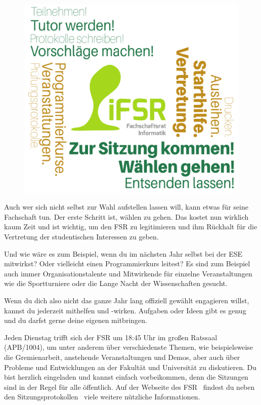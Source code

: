 \begin{figure}[b!]
    \centering
    \includegraphics[width=\linewidth]{img/f1_neu}
\end{figure}

Auch wer sich nicht selbst zur Wahl aufstellen lassen will, kann etwas für seine Fachschaft tun.
Der erste Schritt ist, wählen zu gehen. Das kostet nun wirklich kaum Zeit und ist wichtig, um den FSR zu legitimieren und ihm Rückhalt für die Vertretung der studentischen Interessen zu geben.

Und wie wäre es zum Beispiel, wenn du im nächsten Jahr selbst bei der ESE mitwirkst? Oder vielleicht einen Programmierkurs leitest?
Es sind zum Beispiel auch immer Organisationstalente und Mitwirkende für einzelne Veranstaltungen wie die Sportturniere oder die Lange Nacht der Wissenschaften gesucht.

Wenn du dich also nicht das ganze Jahr lang offiziell gewählt engagieren willst, kannst du jederzeit mithelfen und -wirken. Aufgaben oder Ideen gibt es genug und du darfst gerne deine eigenen mitbringen.

Jeden Dienstag trifft sich der FSR um 18:45 Uhr im großen Ratssaal (APB/1004), um unter anderem über verschiedenste Themen, wie beispielsweise die Gremienarbeit, anstehende Veranstaltungen und Demos, aber auch über Probleme und Entwicklungen an der Fakultät und Universität zu diskutieren.
Du bist herzlich eingeladen und kannst einfach vorbeikommen, denn die Sitzungen sind in der Regel für alle öffentlich. Auf der Webseite des FSR~ findest du neben den Sitzungsprotokollen~ viele weitere nützliche Informationen.

